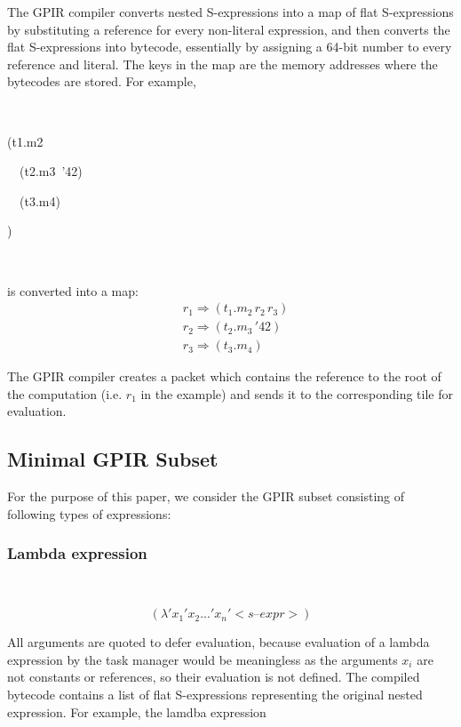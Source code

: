 \documentclass[copyright,creativecommons]{eptcs}
\newenvironment{lyxcode}
{\par\begin{list}{}{
\setlength{\rightmargin}{\leftmargin}
\setlength{\listparindent}{0pt}\raggedright
\setlength{\itemsep}{0pt}
\setlength{\parsep}{0pt}
\normalfont\ttfamily}\item[]}
{\end{list}}
\begin{document}
The GPIR compiler converts nested S-expressions into a map of flat
S-expressions by substituting a reference for every non-literal expression,
and then converts the flat S-expressions into bytecode, essentially
by assigning a 64-bit number to every reference and literal. The keys
in the map are the memory addresses where the bytecodes are stored.
For example,
\begin{lyxcode}
{\small{}~}{\small \par}

{\small (t1.m2~}{\small \par}

{\small{}~~(t2.m3~'42)~}{\small \par}

{\small{}~~(t3.m4)}{\small \par}

{\small )}{\small \par}

{\small{}~}{\small \par}
\end{lyxcode}
is converted into a map:
\begin{align*}
 & r_{1}\Rightarrow(t_{1}.m_{2}\, r_{2}\, r_{3})\\
 & r_{2}\Rightarrow(t_{2}.m_{3}\,'42)\\
 & r_{3}\Rightarrow(t_{3}.m_{4})
\end{align*}


The GPIR compiler creates a packet which contains the reference to
the root of the computation (i.e. $r_{1}$ in the example) and sends
it to the corresponding tile for evaluation. 


\subsection{Minimal GPIR Subset}

For the purpose of this paper, we consider the GPIR subset consisting
of following types of expressions:


\subsubsection{Lambda expression}

~

\[
(\lambda'x_{1}'x_{2}...'x_{n}'<s\text{–}expr>)
\]


All arguments are quoted to defer evaluation, because evaluation of
a lambda expression by the task manager would be meaningless as the
arguments $x_{i}$ are not constants or references, so their evaluation
is not defined. The compiled bytecode contains a list of flat S-expressions
representing the original nested expression. For example, the lamdba
expression 
\end{document}
